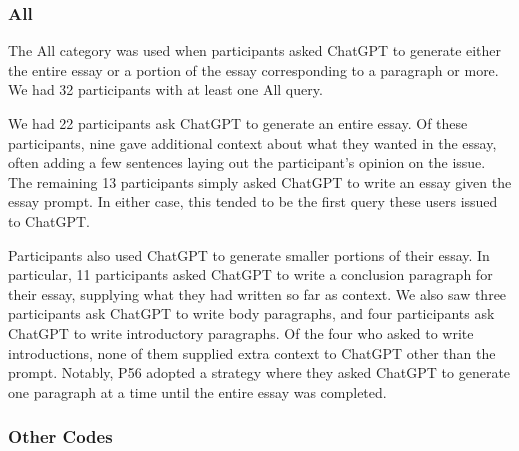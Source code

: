 \documentclass[manuscript,screen,acmsmall]{acmart}
\begin{document}
    
    \subsubsection{All}

    The All category was used when participants asked ChatGPT to generate either the entire essay or a portion of the essay corresponding to a paragraph or more.
    We had 32 participants with at least one All query.

    We had 22 participants ask ChatGPT to generate an entire essay.
    Of these participants, nine gave additional context about what they wanted in the essay, often adding a few sentences laying out the participant's opinion on the issue.
    The remaining 13 participants simply asked ChatGPT to write an essay given the essay prompt.
    In either case, this tended to be the first query these users issued to ChatGPT.

    Participants also used ChatGPT to generate smaller portions of their essay.
    In particular, 11 participants asked ChatGPT to write a conclusion paragraph for their essay, supplying what they had written so far as context.
    We also saw three participants ask ChatGPT to write body paragraphs, and four participants ask ChatGPT to write introductory paragraphs.
    Of the four who asked to write introductions, none of them supplied extra context to ChatGPT other than the prompt.
    Notably, P56 adopted a strategy where they asked ChatGPT to generate one paragraph at a time until the entire essay was completed.
        

    \subsubsection{Other Codes}
\end{document}
